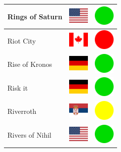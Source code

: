 \documentclass[12pt, a4paper, twoside]{report}
\begin{document}
\begin{center}
\begin{longtable}{|p{5cm}|p{2cm}|p{2cm}|}
 Rings of Saturn                                            & \includegraphics[width=1cm]{../4x3/us} &   \includegraphics[width=1cm]{../likes/y} \\ \hline
 Riot City                                                  & \includegraphics[width=1cm]{../4x3/ca} &   \includegraphics[width=1cm]{../likes/n} \\ \hline
 Rise of Kronos                                             & \includegraphics[width=1cm]{../4x3/de} &   \includegraphics[width=1cm]{../likes/y} \\ \hline
 Risk it                                                    & \includegraphics[width=1cm]{../4x3/de} &   \includegraphics[width=1cm]{../likes/y} \\ \hline
 Riverroth                                                  & \includegraphics[width=1cm]{../4x3/rs} &   \includegraphics[width=1cm]{../likes/m} \\ \hline
 Rivers of Nihil                                            & \includegraphics[width=1cm]{../4x3/us} &   \includegraphics[width=1cm]{../likes/y} \\ \hline

\end{longtable}
\end{center}
\end{document}
